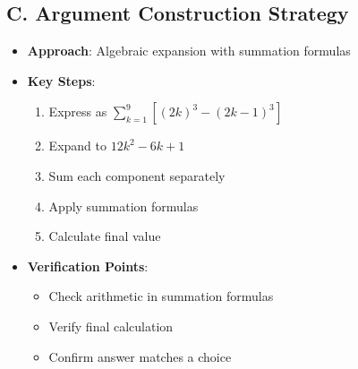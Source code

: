 \documentclass[12pt]{article}
\begin{document}
\begin{strategicbox}
\subsection*{C. Argument Construction Strategy}
\begin{itemize}[leftmargin=*]
    \item \textbf{Approach}: Algebraic expansion with summation formulas
    \item \textbf{Key Steps}:
    \begin{enumerate}
        \item Express as $\sum_{k=1}^{9} [(2k)^3 - (2k-1)^3]$
        \item Expand to $12k^2 - 6k + 1$
        \item Sum each component separately
        \item Apply summation formulas
        \item Calculate final value
    \end{enumerate}
    \item \textbf{Verification Points}: 
    \begin{itemize}
        \item Check arithmetic in summation formulas
        \item Verify final calculation
        \item Confirm answer matches a choice
    \end{itemize}
\end{itemize}
\end{strategicbox}
\end{document}
